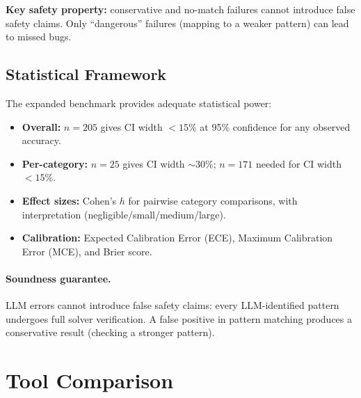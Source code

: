 \documentclass[11pt]{article}
\begin{document}
\noindent
\textbf{Key safety property:} conservative and no-match failures
cannot introduce false safety claims. Only ``dangerous'' failures
(mapping to a weaker pattern) can lead to missed bugs.

\subsection{Statistical Framework}

The expanded benchmark provides adequate statistical power:
\begin{itemize}[nosep]
\item \textbf{Overall:} $n=205$ gives CI width $<15\%$ at 95\%
  confidence for any observed accuracy.
\item \textbf{Per-category:} $n=25$ gives CI width $\sim30\%$;
  $n=171$ needed for CI width $<15\%$.
\item \textbf{Effect sizes:} Cohen's $h$ for pairwise category
  comparisons, with interpretation (negligible/small/medium/large).
\item \textbf{Calibration:} Expected Calibration Error (ECE),
  Maximum Calibration Error (MCE), and Brier score.
\end{itemize}

\paragraph{Soundness guarantee.}
LLM errors cannot introduce false safety claims: every LLM-identified
pattern undergoes full solver verification.  A false positive in pattern
matching produces a conservative result (checking a stronger pattern).

\section{Tool Comparison}
\label{sec:comparison}
\end{document}

